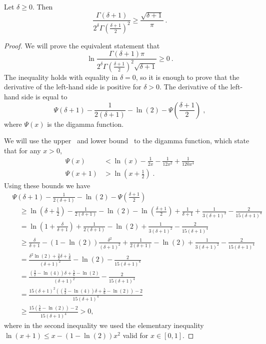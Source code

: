 \begin{lemma}
\label{lemma:ratio_gamma}
Let $\delta \geq 0$. Then
\[
\frac{\Gamma(\delta+1)}{2^\delta \Gamma(\frac{\delta+1}{2})^2}
\geq \frac{\sqrt{\delta+1}}{\pi}~.
\]
\end{lemma}
%
\begin{proof}
We will prove the equivalent statement that
\[
\ln \frac{\Gamma(\delta+1) \pi}{2^\delta \Gamma(\frac{\delta+1}{2})^2 \sqrt{\delta+1}} \geq 0~.
\]
The inequality holds with equality in $\delta=0$, so it is enough to prove that
the derivative of the left-hand side is positive for $\delta > 0$. The
derivative of the left-hand side is equal to
\[
\Psi(\delta+1) - \frac{1}{2(\delta+1)} -\ln(2) - \Psi\left(\frac{\delta+1}{2} \right) \; ,
\]
where $\Psi(x)$ is the digamma function.

We will use the upper~\citep{Chen-2005} and lower bound~\citep{Batir-2008}
to the digamma function, which state that for any $x>0$,
\begin{align*}
\Psi(x) &< \ln(x) -\frac{1}{2x} -\frac{1}{12 x^2} +\frac{1}{120 x^4} \\
\Psi(x+1) &> \ln \left(x+\frac{1}{2} \right) \; .
\end{align*}
Using these bounds we have
\begin{align*}
&\Psi(\delta+1) - \frac{1}{2(\delta+1)} - \ln(2) - \Psi \left(\frac{\delta+1}{2} \right) \\
&\quad \ge \ln \left(\delta+\frac{1}{2} \right) - \frac{1}{2(\delta+1)} -\ln(2) -\ln \left(\frac{\delta+1}{2}\right) + \frac{1}{\delta+1} +\frac{1}{3 (\delta+1)^2} -\frac{2}{15 (\delta+1)^4}\\
&\quad = \ln \left(1+\frac{\delta}{\delta+1} \right)+ \frac{1}{2(\delta+1)} -\ln(2)+\frac{1}{3 (\delta+1)^2} -\frac{2}{15 (\delta+1)^4}\\
&\quad \ge \frac{\delta}{\delta+1} - (1-\ln(2))\frac{\delta^2}{(\delta+1)^2}+ \frac{1}{2(\delta+1)} -\ln(2)+\frac{1}{3 (\delta+1)^2}-\frac{2}{15 (\delta+1)^4}\\
&\quad = \frac{\delta^2 \ln(2)+\frac{3}{2}\delta +\frac{5}{6}}{(\delta+1)^2} - \ln(2)-\frac{2}{15 (\delta+1)^4}\\
&\quad = \frac{(\frac{3}{2}-\ln(4)) \delta +\frac{5}{6}-\ln(2)}{(\delta+1)^2} -\frac{2}{15 (\delta+1)^4} \\
&\quad = \frac{15 (\delta+1)^2 \left((\frac{3}{2}-\ln(4)) \delta +\frac{5}{6}-\ln(2)\right)-2}{15(\delta+1)^4} \\
&\quad \geq \frac{15 \left(\frac{5}{6}-\ln(2)\right)-2}{15(\delta+1)^4} >0,
\end{align*}
where in the second inequality we used the elementary inequality $\ln(x+1) \leq x - (1-\ln(2))x^2$ valid for $x \in [0,1]$.
\end{proof}

